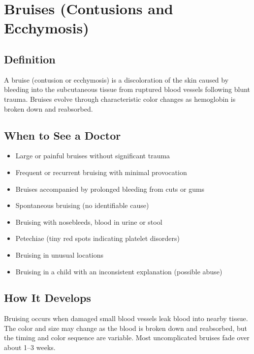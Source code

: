 \chapter{Bruises (Contusions and Ecchymosis)}

\section*{Definition}
A bruise (contusion or ecchymosis) is a discoloration of the skin caused by bleeding into the subcutaneous tissue from ruptured blood vessels following blunt trauma. Bruises evolve through characteristic color changes as hemoglobin is broken down and reabsorbed.

\section*{When to See a Doctor}
\begin{itemize}
\item Large or painful bruises without significant trauma
\item Frequent or recurrent bruising with minimal provocation
\item Bruises accompanied by prolonged bleeding from cuts or gums
\item Spontaneous bruising (no identifiable cause)
\item Bruising with nosebleeds, blood in urine or stool
\item Petechiae (tiny red spots indicating platelet disorders)
\item Bruising in unusual locations
\item Bruising in a child with an inconsistent explanation (possible abuse)
\end{itemize}

\section*{How It Develops}
Bruising occurs when damaged small blood vessels leak blood into nearby tissue. The color and size may change as the blood is broken down and reabsorbed, but the timing and color sequence are variable. Most uncomplicated bruises fade over about 1--3 weeks.

